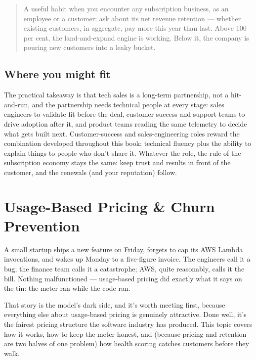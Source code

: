 \begin{quote}\small
A useful habit when you encounter any subscription business, as an employee or a customer: ask about its net revenue retention — whether existing customers, in aggregate, pay more this year than last. Above 100 per cent, the land-and-expand engine is working. Below it, the company is pouring new customers into a leaky bucket.
\end{quote}



\subsection{Where you might fit}


The practical takeaway is that tech sales is a long-term partnership, not a hit-and-run, and the partnership needs technical people at every stage: sales engineers to validate fit before the deal, customer success and support teams to drive adoption after it, and product teams reading the same telemetry to decide what gets built next. Customer-success and sales-engineering roles reward the combination developed throughout this book: technical fluency plus the ability to explain things to people who don't share it. Whatever the role, the rule of the subscription economy stays the same: keep trust and results in front of the customer, and the renewals (and your reputation) follow.

\section{Usage-Based Pricing \& Churn Prevention}
A small startup ships a new feature on Friday, forgets to cap its AWS Lambda invocations, and wakes up Monday to a five-figure invoice. The engineers call it a bug; the finance team calls it a catastrophe; AWS, quite reasonably, calls it the bill. Nothing malfunctioned — usage-based pricing did exactly what it says on the tin: the meter ran while the code ran.


That story is the model's dark side, and it's worth meeting first, because everything else about usage-based pricing is genuinely attractive. Done well, it's the fairest pricing structure the software industry has produced. This topic covers how it works, how to keep the meter honest, and (because pricing and retention are two halves of one problem) how health scoring catches customers before they walk.



